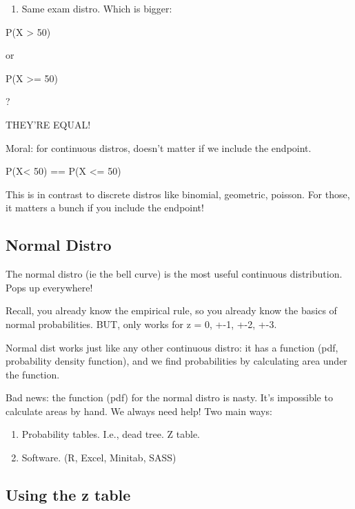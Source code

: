 \documentclass[]{article}
\providecommand{\tightlist}{%
  \setlength{\itemsep}{0pt}\setlength{\parskip}{0pt}}
\begin{document}
\begin{enumerate}
\def\labelenumi{\arabic{enumi})}
\setcounter{enumi}{4}
\tightlist
\item
  Same exam distro. Which is bigger:
\end{enumerate}

P(X \textgreater{} 50)

or

P(X \textgreater{}= 50)

?

THEY'RE EQUAL!

Moral: for continuous distros, doesn't matter if we include the
endpoint.

P(X\textless{} 50) == P(X \textless{}= 50)

This is in contrast to discrete distros like binomial, geometric,
poisson. For those, it matters a bunch if you include the endpoint!

\hypertarget{normal-distro-1}{%
\subsection{Normal Distro}\label{normal-distro-1}}

The normal distro (ie the bell curve) is the most useful continuous
distribution. Pops up everywhere!

Recall, you already know the empirical rule, so you already know the
basics of normal probabilities. BUT, only works for z = 0, +-1, +-2,
+-3.

Normal dist works just like any other continuous distro: it has a
function (pdf, probability density function), and we find probabilities
by calculating area under the function.

Bad news: the function (pdf) for the normal distro is nasty. It's
impossible to calculate areas by hand. We always need help! Two main
ways:

\begin{enumerate}
\def\labelenumi{\arabic{enumi})}
\tightlist
\item
  Probability tables. I.e., dead tree. Z table.
\item
  Software. (R, Excel, Minitab, SASS)
\end{enumerate}

\hypertarget{using-the-z-table-1}{%
\subsection{Using the z table}\label{using-the-z-table-1}}
\end{document}
